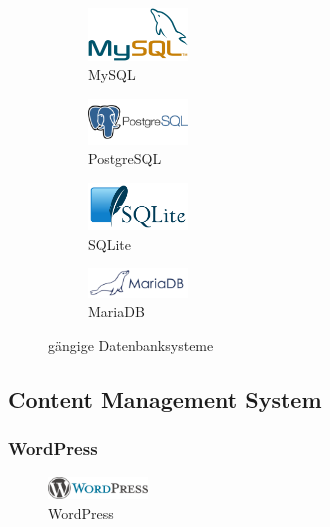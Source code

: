 \documentclass[a4paper,11pt,twoside,titlepage,openright]{report}
\numberwithin{equation}{section}		%
\numberwithin{figure}{section}			%
\numberwithin{table}{section}				%
\begin{document}
\begin{figure}[H]
	\centering
	\begin{subfigure}[b]{0.4\textwidth}
		\includegraphics[width=100px]{Images/MySQL.png}
        \caption{MySQL}
	\end{subfigure}
	\begin{subfigure}[b]{0.4\textwidth}
		\includegraphics[width=100px]{Images/postgresql.png}
    	\caption{PostgreSQL}
	\end{subfigure}
    
	\begin{subfigure}[b]{0.4\textwidth}
		\includegraphics[width=100px]{Images/SQLite.png}
        \caption{SQLite}
	\end{subfigure}
	\begin{subfigure}[b]{0.4\textwidth}
		\includegraphics[width=100px]{Images/mariadb.png}
    	\caption{MariaDB}
	\end{subfigure}
	\caption{gängige Datenbanksysteme}
\end{figure}

\subsection{Content Management System}

\subsubsection{WordPress}

\begin{figure}
\centering
\includegraphics[width=100px]{Images/WordPress.png}
\caption{WordPress}
\end{figure}
\end{document}
